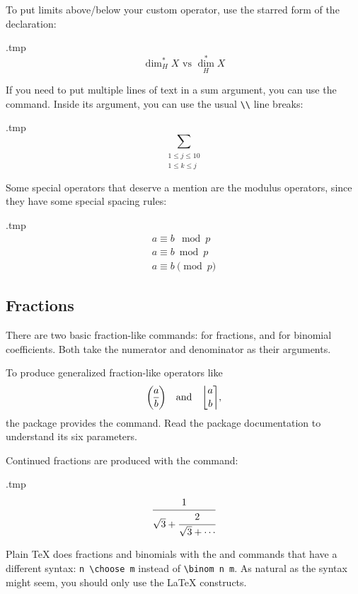 To put limits above/below your custom operator, use the starred form of the declaration:
%
\begin{VerbatimOut}{\jobname.tmp}
\[
\operatorname{dim}_H^\ast X
\text{ vs }
\operatorname*{dim}_H^\ast X
\]
\end{VerbatimOut}
\ShowExample

If you need to put multiple lines of text in a sum argument,
you can use the  command.
Inside its argument, you can use the usual \verb|\\| line breaks:
%
\begin{VerbatimOut}{\jobname.tmp}
\[
\sum_{\substack{1 \leq j \leq 10\\ 1 \leq k \leq j}}
\]
\end{VerbatimOut}
\ShowExample


Some special operators that deserve a mention are the modulus operators,
since they have some special spacing rules:
%
\begin{VerbatimOut}{\jobname.tmp}
\begin{gather*}
a \equiv b \mod p\\
a \equiv b \bmod p\\
a \equiv b \pmod p
\end{gather*}
\end{VerbatimOut}
\ShowExample


%
%
\subsection{Fractions}
There are two basic fraction-like commands:  for fractions,
and  for binomial coefficients.
Both take the numerator and denominator as their arguments.

To produce generalized fraction-like operators like
\[
\genfrac{(}{)}{}{}{a}{b}
\quad\text{and}\quad
\genfrac{\lfloor}{\rceil}{0pt}{}{a}{b},
\]
the  package provides the  command.
Read the package documentation to understand its six parameters.

Continued fractions are produced with the  command:
%
\begin{VerbatimOut}{\jobname.tmp}
\[
\cfrac{1}{\sqrt 3 + \cfrac{2}{\sqrt 3 + \dotsb}}
\]
\end{VerbatimOut}
\ShowExample

\begin{warning}
Plain \TeX{} does fractions and binomials with the  and  commands
that have a different syntax: \verb|n \choose m| instead of \verb|\binom n m|.
As natural as the syntax might seem, you should only use the \LaTeX{} constructs.
\end{warning}



